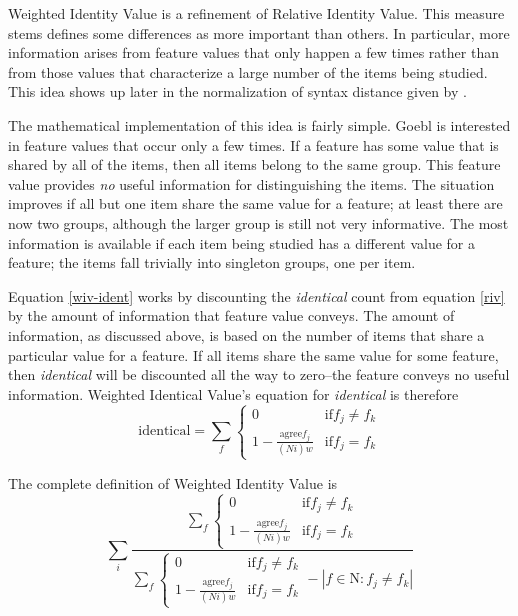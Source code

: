 \documentclass[11pt]{article}
\begin{document}
Weighted Identity Value is a refinement of Relative Identity
Value. This measure stems defines some differences as more
important than others. In particular, more information arises from
feature values that only happen a few times rather than from those values
that characterize a large number of the items being studied.  This
idea shows up later in the normalization of syntax distance given by
.

The mathematical implementation of this idea is fairly simple. Goebl
is interested in feature values that occur only a few times. If a
feature has some value that is shared by all of the items, then all
items belong to the same group. This feature value provides {\it no}
useful information for distinguishing the items.  The situation
improves if all but one item share the same value for a feature; at
least there are now two groups, although the larger group is still not
very informative.  The most information is available if each item
being studied has a different value for a feature; the items fall
trivially into singleton groups, one per item.

Equation \ref{wiv-ident} works by discounting
the \textit{identical} count from equation \ref{riv} by
the amount of information that feature value conveys. The
amount of information, as discussed above, is based on the number of
items that share a particular value for a feature. If all items share
the same value for some feature, then \textit{identical} will be discounted all the
way to zero--the feature conveys no useful information.
Weighted Identical Value's equation for \textit{identical} is
therefore
\begin{equation}
  \textrm{identical} = \sum_f \left\{
  \begin{array}{ll}
    0 & \textrm{if} f_j \neq f_k \\
    1 - \frac{\textrm{agree}f_{j}}{(Ni)w} & \textrm{if} f_j = f_k
  \end{array} \right.
\label{wiv-ident}
\end{equation}

\noindent{}The complete definition of Weighted Identity Value is
\begin{equation} \sum_i \frac{\sum_f \left\{
  \begin{array}{ll}
    0 & \textrm{if} f_j \neq f_k \\
    1 - \frac{\textrm{agree}f_j} {(Ni)w} & \textrm{if} f_j = f_k
\end{array} \right.}
  {\sum_f \left\{
  \begin{array}{ll}
    0 & \textrm{if} f_j \neq f_k \\
    1 - \frac{\textrm{agree}f_j} {(Ni)w} & \textrm{if} f_j = f_k
    \end{array} \right. - |f \in \textrm{N} : f_j \neq f_k|}
  \label{wiv-full}
  \end{equation}
\end{document}
